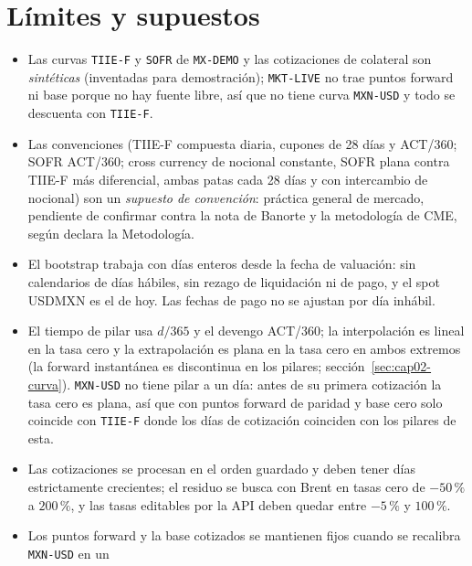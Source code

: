 \section{Límites y supuestos}\label{sec:cap02-limites}

\begin{limites}
  \begin{itemize}
    \item Las curvas \texttt{TIIE-F} y \texttt{SOFR} de \texttt{MX-DEMO} y las cotizaciones de colateral son
          \emph{sintéticas} (inventadas para demostración); \texttt{MKT-LIVE} no trae puntos forward ni base
          porque no hay fuente libre, así que no tiene curva \texttt{MXN-USD} y todo se descuenta con \texttt{TIIE-F}.
    \item Las convenciones (TIIE-F compuesta diaria, cupones de 28 días y ACT/360; SOFR ACT/360; cross currency
          de nocional constante, SOFR plana contra TIIE-F más diferencial, ambas patas cada 28 días y con
          intercambio de nocional) son un \emph{supuesto de convención}: práctica general de mercado, pendiente de
          confirmar contra la nota de Banorte y la metodología de CME, según declara la Metodología.
    \item El bootstrap trabaja con días enteros desde la fecha de valuación: sin calendarios de días hábiles, sin
          rezago de liquidación ni de pago, y el spot USDMXN es el de hoy. Las fechas de pago no se ajustan por
          día inhábil.
    \item El tiempo de pilar usa $d/365$ y el devengo ACT/360; la interpolación es lineal en la tasa cero y la
          extrapolación es plana en la tasa cero en ambos extremos (la forward instantánea es discontinua en los
          pilares; sección~\ref{sec:cap02-curva}). \texttt{MXN-USD} no tiene pilar a un día: antes de su primera
          cotización la tasa cero es plana, así que con puntos forward de paridad y base cero solo coincide con
          \texttt{TIIE-F} donde los días de cotización coinciden con los pilares de esta.
    \item Las cotizaciones se procesan en el orden guardado y deben tener días estrictamente crecientes; el
          residuo se busca con Brent en tasas cero de $-50\,\%$ a $200\,\%$, y las tasas editables por la API
          deben quedar entre $-5\,\%$ y $100\,\%$.
    \item Los puntos forward y la base cotizados se mantienen fijos cuando se recalibra \texttt{MXN-USD} en un

\end{itemize}
\end{limites}
